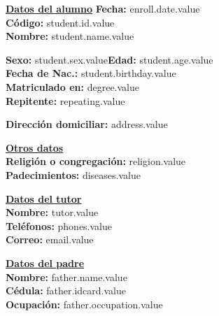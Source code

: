 \documentclass[12pt]{article}
\newcommand{\aField}[1]{#1}
\newcommand{\enrollDate}{enroll.date.value}
\newcommand{\studentName}{student.name.value}
\newcommand{\studentBirthday}{student.birthday.value}
\newcommand{\studentAge}{student.age.value}
\newcommand{\studentSex}{student.sex.value}
\newcommand{\isRepeating}{repeating.value}
\newcommand{\degree}{degree.value}
\newcommand{\address}{address.value}
\newcommand{\religion}{religion.value}
\newcommand{\diseases}{diseases.value}
\newcommand{\tutor}{tutor.value}
\newcommand{\phones}{phones.value}
\newcommand{\email}{email.value}
\newcommand{\fatherName}{father.name.value}
\newcommand{\fatherIdcard}{father.idcard.value}
\newcommand{\fatherOccupation}{father.occupation.value}
\newcommand{\studentId}{student.id.value}
\begin{document}
    \textbf{\uline{Datos del alumno}} \hfill \textbf{Fecha:} \enrollDate\\[1mm]
    \textbf{Código:} \aField{\studentId}\\
    \textbf{Nombre:} \aField{\studentName}
    \par\vspace{1mm}
    \begin{minipage}[t]{0.49\textwidth}
        \textbf{Sexo:} \aField{\studentSex}\hspace{6mm}\textbf{Edad:} \aField{\studentAge}\\
        \textbf{Fecha de Nac.:} \aField{\studentBirthday}\\
        \textbf{Matriculado en:} \aField{\degree}\\
        \textbf{Repitente:} \aField{\isRepeating}
    \end{minipage}
    \hfill
    \begin{minipage}[t]{0.49\textwidth}
        \textbf{Dirección domiciliar:} \aField{\address}
    \end{minipage}
    \par\vspace{4mm}
    \begin{minipage}[t]{0.49\textwidth}
        \textbf{\uline{Otros datos}}\\[1mm]
        \textbf{Religión o congregación:} \aField{\religion}\\
        \textbf{Padecimientos:} \aField{\diseases}
    \end{minipage}
    \hfill
    \begin{minipage}[t]{0.49\textwidth}
        \textbf{\uline{Datos del tutor}}\\[1mm]
        \textbf{Nombre:} \aField{\tutor}\\
        \textbf{Teléfonos:} \aField{\phones}\\
        \textbf{Correo:} \aField{\email}
    \end{minipage}
    \par\vspace{4mm}
    \begin{minipage}[t]{0.49\textwidth}
        \textbf{\uline{Datos del padre}}\\[1mm]
        \textbf{Nombre:} \aField{\fatherName}\\
        \textbf{Cédula:} \aField{\fatherIdcard}\\
        \textbf{Ocupación:} \aField{\fatherOccupation}
    \end{minipage}
    \hfill
\end{document}
